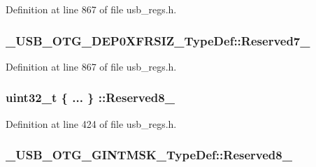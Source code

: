 Definition at line 867 of file usb\-\_\-regs.\-h.

\hypertarget{group___u_s_b___o_t_g___d_r_i_v_e_r_ga709b318e2fe53d1ccbbb6a274f7cdf9b}{
\subsubsection[{Reserved7\-\_\-18}]{ \-\_\-\-U\-S\-B\-\_\-\-O\-T\-G\-\_\-\-D\-E\-P0\-X\-F\-R\-S\-I\-Z\-\_\-\-Type\-Def\-::\-Reserved7\-\_}}\label{group___u_s_b___o_t_g___d_r_i_v_e_r_ga709b318e2fe53d1ccbbb6a274f7cdf9b}


Definition at line 867 of file usb\-\_\-regs.\-h.

\hypertarget{group___u_s_b___o_t_g___d_r_i_v_e_r_ga459562df770d5910dcd19c119a8c8788}{
\subsubsection[{Reserved8\-\_\-9}]{\setlength{\rightskip}{0pt plus 5cm}uint32\-\_\-t \{ ... \} \-::Reserved8\-\_}}\label{group___u_s_b___o_t_g___d_r_i_v_e_r_ga459562df770d5910dcd19c119a8c8788}


Definition at line 424 of file usb\-\_\-regs.\-h.

\hypertarget{group___u_s_b___o_t_g___d_r_i_v_e_r_gaabc7a277eeafc9497a745a5ca980f27e}{
\subsubsection[{Reserved8\-\_\-9}]{ \-\_\-\-U\-S\-B\-\_\-\-O\-T\-G\-\_\-\-G\-I\-N\-T\-M\-S\-K\-\_\-\-Type\-Def\-::\-Reserved8\-\_}}\label{group___u_s_b___o_t_g___d_r_i_v_e_r_gaabc7a277eeafc9497a745a5ca980f27e}


